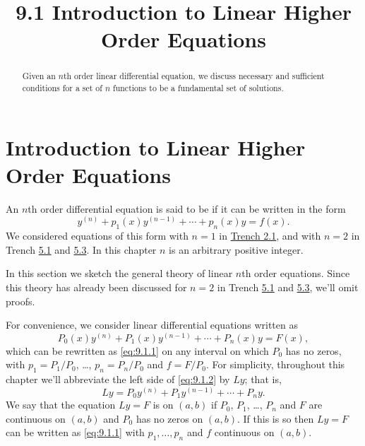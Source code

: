 \documentclass{ximera}
\title{9.1 Introduction to Linear Higher Order Equations}%
\begin{document}
\begin{abstract}
Given an $n$th order linear differential equation, we discuss necessary and sufficient conditions for a set of $n$ functions to be a fundamental set of solutions.
\end{abstract}

\maketitle

\section*{Introduction to Linear Higher Order Equations}

An $n$th order differential equation is said to be  if it
can be written in the form
\begin{equation}\label{eq:9.1.1}
y^{(n)}+p_1(x)y^{(n-1)}+\cdots+p_n(x)y=f(x).
\end{equation}
We considered equations of this form with $n=1$ in
\href{https://ximera.osu.edu/ode/main/linearFirstOrderDiffEq/linearFirstOrderDiffEq}{Trench 2.1}, and with $n=2$ in
Trench \href{https://ximera.osu.edu/ode/main/homogeneousLinearEquations/homogeneousLinearEquations}{5.1} and \href{https://ximera.osu.edu/ode/main/nonHomogeneousLinear/nonHomogeneousLinear}{5.3}. In this chapter $n$ is an arbitrary
positive integer.

In this section we sketch the general theory of linear $n$th order
equations. Since this theory has already been discussed for $n=2$ in Trench \href{https://ximera.osu.edu/ode/main/homogeneousLinearEquations/homogeneousLinearEquations}{5.1} and \href{https://ximera.osu.edu/ode/main/nonHomogeneousLinear/nonHomogeneousLinear}{5.3}, we'll omit
proofs.

For convenience, we consider linear differential equations written
as
\begin{equation}\label{eq:9.1.2}
P_0(x)y^{(n)}+P_1(x)y^{(n-1)}+\cdots+P_n(x)y=F(x),
\end{equation}
which can be rewritten as \eqref{eq:9.1.1} on any interval on
which $P_0$ has no zeros, with $p_1=P_1/P_0$, \dots, $p_n=P_n/P_0$ and
$f=F/P_0$. For simplicity, throughout this chapter we'll
abbreviate the left side of \eqref{eq:9.1.2} by $Ly$; that is,
$$
Ly=P_0y^{(n)}+P_1y^{(n-1)}+\cdots+P_ny.
$$
We say that the equation $Ly=F$ is  on $(a,b)$ if
$P_0$, $P_1$, \dots, $P_n$ and $F$ are continuous on $(a,b)$ and $P_0$ has
no zeros on $(a,b)$. If this is so then $Ly=F$ can be
written as \eqref{eq:9.1.1} with $p_1, \dots, p_n$ and $f$ continuous on
$(a,b)$.
\end{document}
